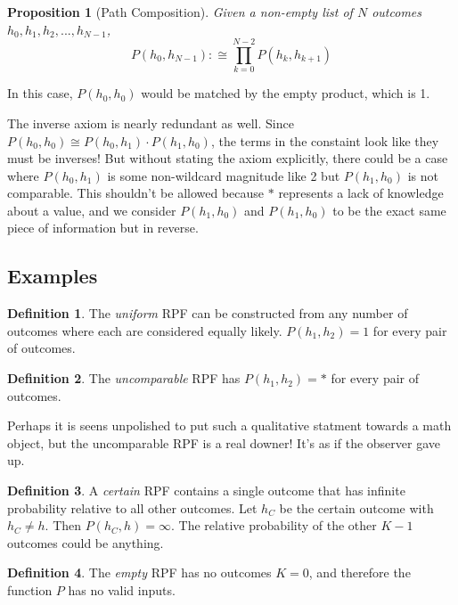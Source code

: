 \documentclass[twoside]{article}
\theoremstyle{plain}%
\newtheorem{proposition}[theorem]{Proposition}
\theoremstyle{definition}
\newtheorem{definition}{Definition}[section]
\theoremstyle{remark}
\begin{document}
\begin{proposition}[Path Composition]
Given a non-empty list of \(N\) outcomes \(h_0, h_1, h_2, ..., h_{N-1}\), \[P(h_0, h_{N-1}) :\cong \prod_{k=0}^{N-2} P(h_k, h_{k+1}) \]
\end{proposition}

In this case, \(P(h_0, h_0)\) would be matched by the empty product, which is 1.

The inverse axiom is nearly redundant as well. Since \(P(h_0, h_0) \cong P(h_0, h_1) \cdot P(h_1, h_0)\), the terms in the constaint look like they must be inverses! But without stating the axiom explicitly, there could be a case where \(P(h_0, h_1)\) is some non-wildcard magnitude like 2 but \(P(h_1, h_0)\) is not comparable. This shouldn't be allowed because \(\ast\) represents a lack of knowledge about a value, and we consider \(P(h_1, h_0)\) and \(P(h_1, h_0)\) to be the exact same piece of information but in reverse.

\subsection{Examples}

\begin{definition}
\label{def:uniform_rpf}
The \textit{uniform} RPF can be constructed from any number of outcomes where each are considered equally likely. \(P(h_1, h_2) = 1\) for every pair of outcomes.
\end{definition}

\begin{definition}
\label{def:uncomparable_rpf}
The \textit{uncomparable} RPF has \(P(h_1, h_2) = \ast\) for every pair of outcomes.
\end{definition}

Perhaps it is seens unpolished to put such a qualitative statment towards a math object, but the uncomparable RPF is a real downer! It's as if the observer gave up.

\begin{definition}
A \textit{certain} RPF contains a single outcome that has infinite probability relative to all other outcomes. Let \(h_C\) be the certain outcome with \(h_C \neq h\). Then \(P(h_C, h) = \infty\). The relative probability of the other \(K-1\) outcomes could be anything.
\end{definition}

\begin{definition}
\label{def:empty_rpf}
The \textit{empty} RPF has no outcomes \(K = 0\), and therefore the function \(P\) has no valid inputs.
\end{definition}
\end{document}
